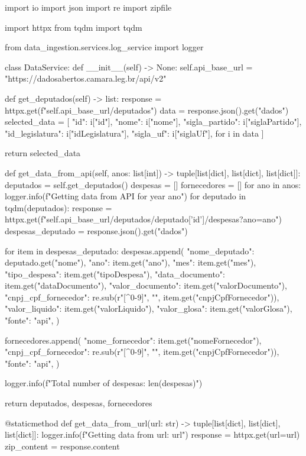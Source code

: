 \documentclass[12pt, a4paper]{article}
\begin{document}
\begin{python}
import io
import json
import re
import zipfile

import httpx
from tqdm import tqdm

from data_ingestion.services.log_service import logger


class DataService:
	def __init__(self) -> None:
	self.api_base_url = "https://dadosabertos.camara.leg.br/api/v2"
	
	def get_deputados(self) -> list:
		response = httpx.get(f"{self.api_base_url}/deputados")
		data = response.json().get("dados")
		selected_data = [
			{
				"id": i["id"],
				"nome": i["nome"],
				"sigla_partido": i["siglaPartido"],
				"id_legislatura": i["idLegislatura"],
				"sigla_uf": i["siglaUf"],
			}
			for i in data
			]
	
		return selected_data
	
	def get_data_from_api(self, anos: list[int]) -> tuple[list[dict], list[dict], list[dict]]:
		deputados = self.get_deputados()
		despesas = []
		fornecedores = []
		for ano in anos:
			logger.info(f"Getting data from API for year {ano}")
			for deputado in tqdm(deputados):
				response = httpx.get(f"{self.api_base_url}/deputados/{deputado['id']}/despesas?ano={ano}")
				despesas_deputado = response.json().get("dados")
		
				for item in despesas_deputado:
					despesas.append({
						"nome_deputado": deputado.get("nome"),
						"ano": item.get("ano"),
						"mes": item.get("mes"),
						"tipo_despesa": item.get("tipoDespesa"),
						"data_documento": item.get("dataDocumento"),
						"valor_documento": item.get("valorDocumento"),
						"cnpj_cpf_fornecedor": re.sub(r"[^0-9]", "", item.get("cnpjCpfFornecedor")),
						"valor_liquido": item.get("valorLiquido"),
						"valor_glosa": item.get("valorGlosa"),
						"fonte": "api",
					})
		
					fornecedores.append({
						"nome_fornecedor": item.get("nomeFornecedor"),
						"cnpj_cpf_fornecedor": re.sub(r"[^0-9]", "", item.get("cnpjCpfFornecedor")),
						"fonte": "api",
					})
		
		logger.info(f"Total number of despesas: {len(despesas)}")
		
		return deputados, despesas, fornecedores
	
	@staticmethod
	def get_data_from_url(url: str) -> tuple[list[dict], list[dict], list[dict]]:
		logger.info(f"Getting data from url: {url}")
		response = httpx.get(url=url)
		zip_content = response.content
		

\end{python}
\end{document}
